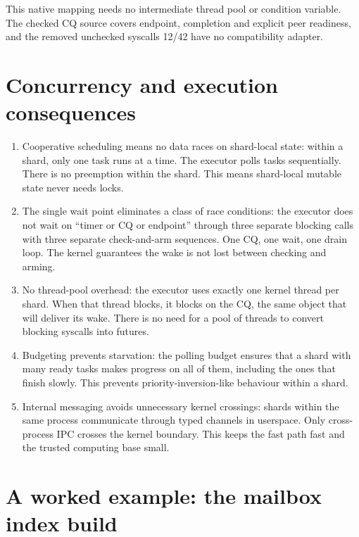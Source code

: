 This native mapping needs no intermediate thread pool or condition variable.
The checked CQ source covers endpoint, completion and explicit peer readiness, and
the removed unchecked syscalls 12/42 have no compatibility adapter.

\section{Concurrency and execution consequences}

\begin{enumerate}
    \item Cooperative scheduling means no data races on shard-local state:
        within a shard, only one task runs at a time. The executor polls tasks
        sequentially. There is no preemption within the shard. This means
        shard-local mutable state never needs locks.

    \item The single wait point eliminates a class of race conditions:
        the executor does not wait on ``timer or CQ or endpoint'' through three
        separate blocking calls with three separate check-and-arm sequences. One
        CQ, one wait, one drain loop. The kernel guarantees the wake is not lost
        between checking and arming.

    \item No thread-pool overhead: the executor uses exactly one kernel
        thread per shard. When that thread blocks, it blocks on the CQ, the same
        object that will deliver its wake. There is no need for a pool of
        threads to convert blocking syscalls into futures.

    \item Budgeting prevents starvation: the polling budget ensures that
        a shard with many ready tasks makes progress on all of them, including the
        ones that finish slowly. This prevents priority-inversion-like behaviour
        within a shard.

    \item Internal messaging avoids unnecessary kernel crossings: shards
        within the same process communicate through typed channels in userspace.
        Only cross-process IPC crosses the kernel boundary. This keeps the fast
        path fast and the trusted computing base small.
\end{enumerate}

\section{A worked example: the mailbox index build}
\label{sec:sitas-mailbox-index}

